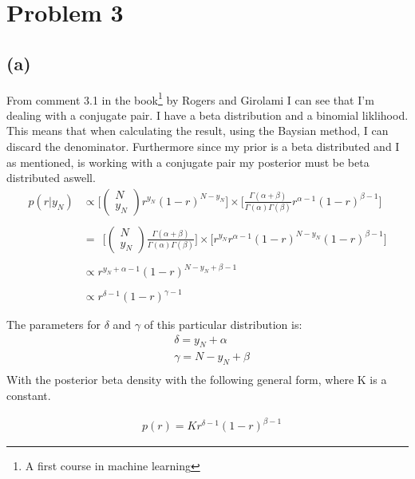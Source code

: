 \section{Problem 3}
\subsection{(a)}
From comment 3.1 in the book\footnote{A first course in machine learning} by Rogers and Girolami
I can see that I'm dealing with a conjugate pair. I have a beta distribution and a binomial liklihood.
This means that when calculating the result, using the Baysian method, I can discard the denominator.
Furthermore since my prior is a beta distributed and I as mentioned, is working with a conjugate pair
my posterior must be beta distributed aswell.
\\
\begin{align*}
    p(r|y_N) & \propto \Bigg[ \begin{pmatrix} N \\ y_N\end{pmatrix} r^{y_N}(1-r)^{N - y_N} \Bigg] \times \Bigg[ \frac{\Gamma (\alpha + \beta)}{\Gamma(\alpha)\Gamma(\beta)} r^{\alpha - 1}(1 - r)^{\beta - 1}\Bigg] \\
    & \\
    & =\;\, \Bigg[ \begin{pmatrix} N \\ y_N\end{pmatrix} \frac{\Gamma (\alpha + \beta)}{\Gamma(\alpha)\Gamma(\beta)} \Bigg] \times \Bigg[ r^{y_N} r^{\alpha - 1} (1-r)^{N - y_N} (1 - r)^{\beta - 1} \Bigg] \\
    & \\
    & \propto r^{y_N + \alpha - 1} (1 - r)^{N - y_N + \beta - 1} \\
    & \\
    & \propto r^{\delta - 1}(1 - r)^{\gamma - 1}
\end{align*}

The parameters for $\delta$ and $\gamma$ of this particular distribution is:
\begin{align*}
    & \delta = y_N + \alpha \\
    & \gamma = N - y_N + \beta \\
\end{align*}
With the posterior beta density with the following general form, where K is a constant.

\begin{align*}
    & p(r) = K r^{\delta - 1}(1 - r)^{\beta - 1}
\end{align*}

